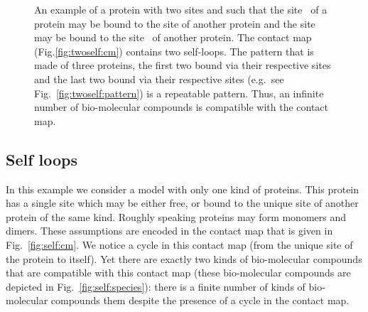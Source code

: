 \documentclass{entcs}
\begin{document}
\begin{figure}
\caption{An example of a protein with two sites  and  such that the site {}\;\; of a protein may be bound to the site  of another protein and the site  may be bound to the site \;\; of another protein.
The contact map (Fig.\ref{fig:twoself:cm}) contains two self-loops.
The pattern that is made of three proteins, the first two bound via their respective sites  and the last two bound via their respective sites  (e.g.~see Fig.~\ref{fig:twoself:pattern}) is a repeatable pattern. Thus, an infinite number of bio-molecular compounds is compatible with the contact map.  }
\end{figure}

\subsection{Self loops}
\label{sec:self-loop}
In this example we consider a model with only one kind of proteins. This protein has a single site which may be either free, or bound to the unique site of another protein of the same kind. Roughly speaking proteins may form monomers  and dimers. These assumptions are encoded in the contact map that is given in Fig.~\ref{fig:self:cm}. We notice a cycle in this contact map (from the unique site of the protein to itself). Yet
there are exactly two kinds of bio-molecular compounds that are
compatible with this contact map (these bio-molecular compounds are depicted in Fig.~\ref{fig:self:species}):  there is a finite number of kinds of bio-molecular compounds them despite the presence of a cycle in the contact map.
\end{document}
